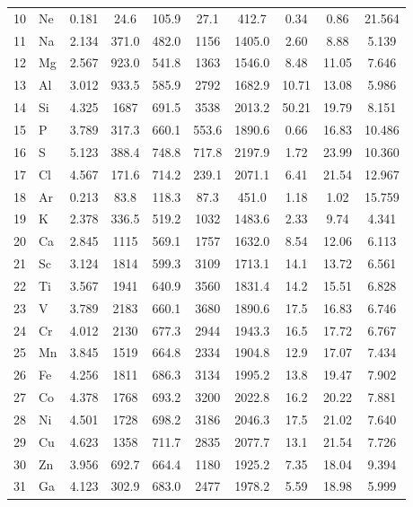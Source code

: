 \documentclass[11pt,a4paper]{article}
\begin{document}
\begin{longtable}{@{}llcccccccc@{}}
		10 & Ne  & 0.181 & 24.6   & 105.9  & 27.1   & 412.7  & 0.34  & 0.86  & 21.564 \\
		11 & Na  & 2.134 & 371.0  & 482.0  & 1156   & 1405.0 & 2.60  & 8.88  & 5.139 \\
		12 & Mg  & 2.567 & 923.0  & 541.8  & 1363   & 1546.0 & 8.48  & 11.05 & 7.646 \\
		13 & Al  & 3.012 & 933.5  & 585.9  & 2792   & 1682.9 & 10.71 & 13.08 & 5.986 \\
		14 & Si  & 4.325 & 1687   & 691.5  & 3538   & 2013.2 & 50.21 & 19.79 & 8.151 \\
		15 & P   & 3.789 & 317.3  & 660.1  & 553.6  & 1890.6 & 0.66  & 16.83 & 10.486 \\
		16 & S   & 5.123 & 388.4  & 748.8  & 717.8  & 2197.9 & 1.72  & 23.99 & 10.360 \\
		17 & Cl  & 4.567 & 171.6  & 714.2  & 239.1  & 2071.1 & 6.41  & 21.54 & 12.967 \\
		18 & Ar  & 0.213 & 83.8   & 118.3  & 87.3   & 451.0  & 1.18  & 1.02  & 15.759 \\
		19 & K   & 2.378 & 336.5  & 519.2  & 1032   & 1483.6 & 2.33  & 9.74  & 4.341 \\
		20 & Ca  & 2.845 & 1115   & 569.1  & 1757   & 1632.0 & 8.54  & 12.06 & 6.113 \\
		21 & Sc  & 3.124 & 1814   & 599.3  & 3109   & 1713.1 & 14.1  & 13.72 & 6.561 \\
		22 & Ti  & 3.567 & 1941   & 640.9  & 3560   & 1831.4 & 14.2  & 15.51 & 6.828 \\
		23 & V   & 3.789 & 2183   & 660.1  & 3680   & 1890.6 & 17.5  & 16.83 & 6.746 \\
		24 & Cr  & 4.012 & 2130   & 677.3  & 2944   & 1943.3 & 16.5  & 17.72 & 6.767 \\
		25 & Mn  & 3.845 & 1519   & 664.8  & 2334   & 1904.8 & 12.9  & 17.07 & 7.434 \\
		26 & Fe  & 4.256 & 1811   & 686.3  & 3134   & 1995.2 & 13.8  & 19.47 & 7.902 \\
		27 & Co  & 4.378 & 1768   & 693.2  & 3200   & 2022.8 & 16.2  & 20.22 & 7.881 \\
		28 & Ni  & 4.501 & 1728   & 698.2  & 3186   & 2046.3 & 17.5  & 21.02 & 7.640 \\
		29 & Cu  & 4.623 & 1358   & 711.7  & 2835   & 2077.7 & 13.1  & 21.54 & 7.726 \\
		30 & Zn  & 3.956 & 692.7  & 664.4  & 1180   & 1925.2 & 7.35  & 18.04 & 9.394 \\
		31 & Ga  & 4.123 & 302.9  & 683.0  & 2477   & 1978.2 & 5.59  & 18.98 & 5.999 \\

\end{longtable}
\end{document}
